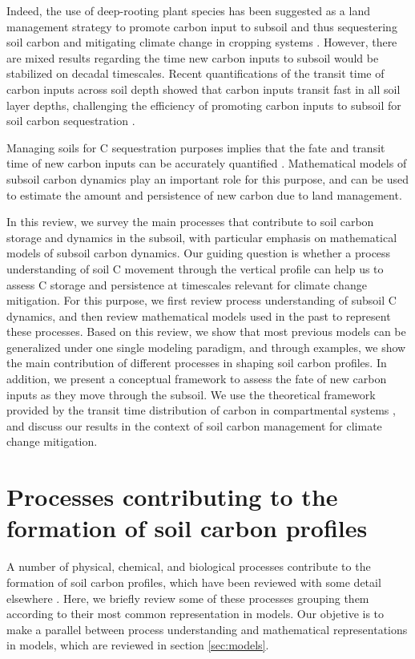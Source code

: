 \documentclass[11pt, oneside, a4paper]{article}   	%
\begin{document}
Indeed, the use of deep-rooting plant species has been suggested as a land management strategy to promote carbon input to subsoil and thus sequestering soil carbon and mitigating climate change in cropping systems \citep{Kell2011, Thorup2020}. However, there are mixed results regarding the time new carbon inputs to subsoil would be stabilized on decadal timescales. Recent quantifications of the transit time of carbon inputs across soil depth showed that carbon inputs transit fast in all soil layer depths, challenging the efficiency of promoting carbon inputs to subsoil for soil carbon sequestration \citep{Xiao2022, Wang2023}. 


Managing soils for C sequestration purposes implies that the fate and transit time of new carbon inputs can be accurately quantified \citep{Crow2022}. Mathematical models of subsoil carbon dynamics play an important role for this purpose, and can be used to estimate the amount and persistence of new carbon due to land management. 

In this review, we survey the main processes that contribute to soil carbon storage and dynamics in the subsoil, with particular emphasis on mathematical models of subsoil carbon dynamics. 
Our guiding question is whether a process understanding of soil C movement through the vertical profile can help us to assess C storage and persistence at timescales relevant for climate change mitigation. 
For this purpose, we first review process understanding of subsoil C dynamics, and then review mathematical models used in the past to represent these processes. Based on this review, we show that most previous models can be generalized under one single modeling paradigm, and through examples, we show the main contribution of different processes in shaping soil carbon profiles. 
In addition, we present a conceptual framework to assess the fate of new carbon inputs as they move through the subsoil. We use the theoretical framework provided by the transit time distribution of carbon in compartmental systems \citep{Sierra2017GCB, Sierra2018GBC, Metzler2018MG}, and discuss our results in the context of  soil carbon management for climate change mitigation.

\section{Processes contributing to the formation of soil carbon profiles}
A number of physical, chemical, and biological processes contribute to the formation of soil carbon profiles, which have been reviewed with some detail elsewhere \citep[e.g.][]{Button2022,HicksPries2023}. Here, we briefly review some of these processes grouping them according to their most common representation in models. Our objetive is to make a parallel between process understanding and mathematical representations in models, which are reviewed in section \ref{sec:models}.
\end{document}
